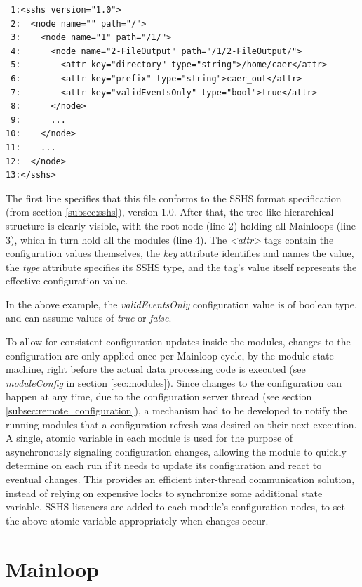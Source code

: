 \documentclass[a4paper,12pt]{report}
\begin{document}
\begin{lstlisting}
 1:<sshs version="1.0">
 2:  <node name="" path="/">
 3:    <node name="1" path="/1/">
 4:      <node name="2-FileOutput" path="/1/2-FileOutput/">
 5:        <attr key="directory" type="string">/home/caer</attr>
 6:        <attr key="prefix" type="string">caer_out</attr>
 7:        <attr key="validEventsOnly" type="bool">true</attr>
 8:      </node>
 9:      ...
10:    </node>
11:    ...
12:  </node>
13:</sshs>
\end{lstlisting}

The first line specifies that this file conforms to the SSHS format specification (from section \ref{subsec:sshs}), version 1.0.
After that, the tree-like hierarchical structure is clearly visible, with the root node (line 2) holding all Mainloops (line 3), which in turn hold all the modules (line 4).
The \emph{<attr>} tags contain the configuration values themselves, the \emph{key} attribute identifies and names the value, the \emph{type} attribute specifies its SSHS type, and the tag's value itself represents the effective configuration value.

In the above example, the \emph{validEventsOnly} configuration value is of boolean type, and can assume values of \emph{true} or \emph{false}.

To allow for consistent configuration updates inside the modules, changes to the configuration are only applied once per Mainloop cycle, by the module state machine, right before the actual data processing code is executed (see \emph{moduleConfig} in section \ref{sec:modules}).
Since changes to the configuration can happen at any time, due to the configuration server thread (see section \ref{subsec:remote_configuration}), a mechanism had to be developed to notify the running modules that a configuration refresh was desired on their next execution. A single, atomic variable in each module is used for the purpose of asynchronously signaling configuration changes, allowing the module to quickly determine on each run if it needs to update its configuration and react to eventual changes. This provides an efficient inter-thread communication solution, instead of relying on expensive locks to synchronize some additional state variable.
SSHS listeners are added to each module's configuration nodes, to set the above atomic variable appropriately when changes occur.

\section{Mainloop} \label{sec:mainloop}
\end{document}
